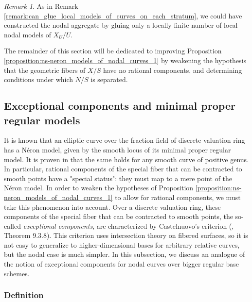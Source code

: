 \documentclass[a4paper,10pt,twoside]{article}
\theoremstyle{definition}
\theoremstyle{remark}
\newtheorem{rem}{Remark}[thm]
\begin{document}
\begin{rem}
As in Remark \ref{remark:can_glue_local_models_of_curves_on_each_stratum}, we could have constructed the nodal aggregate by gluing only a locally finite number of local nodal models of $X_U/U$.
\end{rem}


The remainder of this section will be dedicated to improving Proposition \ref{proposition:ns-neron_models_of_nodal_curves_1} by weakening the hypothesis that the geometric fibers of $X/S$ have no rational components, and determining conditions under which $N/S$ is separated.


\subsection{Exceptional components and minimal proper regular models}

It is known that an elliptic curve over the fraction field of discrete valuation ring has a N\'eron model, given by the smooth locus of its minimal proper regular model. It is proven in \cite{LiuTong} that the same holds for any smooth curve of positive genus. In particular, rational components of the special fiber that can be contracted to smooth points have a "special status": they must map to a mere point of the N\'eron model. In order to weaken the hypotheses of Proposition \ref{proposition:ns-neron_models_of_nodal_curves_1} to allow for rational components, we must take this phenomenon into account. Over a discrete valuation ring, these components of the special fiber that can be contracted to smooth points, the so-called \emph{exceptional components}, are characterized by Castelnuovo's criterion (\cite{Liu}, Theorem 9.3.8). This criterion uses intersection theory on fibered surfaces, so it is not easy to generalize to higher-dimensional bases for arbitrary relative curves, but the nodal case is much simpler. In this subsection, we discuss an analogue of the notion of exceptional components for nodal curves over bigger regular base schemes.

\subsubsection{Definition}
\end{document}
